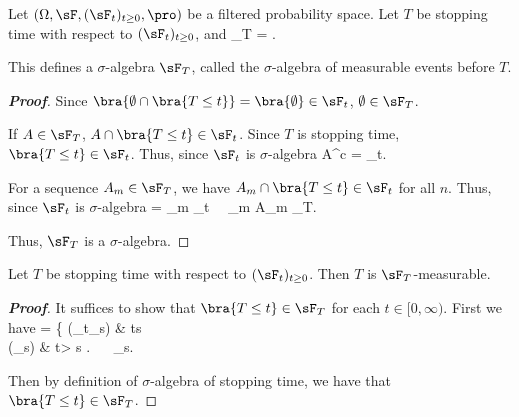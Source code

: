 
\begin{definition}\label{def:sigma_algebra_stopping_time_continuous}
Let $(\Omega,\sF, (\sF_t)_{t\geq 0},\pro)$ be a filtered probability space. Let $T$ be stopping time with respect to $(\sF_t)_{t\geq 0}$, and
\be
\sF_T = \bra{A \in\sF : A\cap \{T \leq t\} \in \sF_t,\ \forall t\in [0,\infty)}.
\ee

This defines a $\sigma$-algebra $\sF_T$, called the $\sigma$-algebra of measurable events before $T$.
\end{definition}

\begin{proof}[\bf Proof]
\ben
\item [(i)] Since $\bra{\emptyset \cap \bra{T\leq t}} = \bra{\emptyset} \in \sF_t$, $\emptyset \in \sF_T$.
\item [(ii)] If $A\in \sF_T$, $A \cap \bra{T\leq t} \in \sF_t$. Since $T$ is stopping time, $\bra{T\leq t}\in \sF_t$. Thus, since $\sF_t$ is $\sigma$-algebra
\be
A^c \cap {} =  \bs {} \in \sF_t.
\ee
\item [(iii)] For a sequence $A_m \in \sF_T$, we have $A_m \cap \bra{T\leq t}\in \sF_t$ for all $n$. Thus, since $\sF_t$ is $\sigma$-algebra
\be
{} \cap {} = \bigcup_m  \in \sF_t  \ \ra \ \bigcup_m A_m \in \sF_T.
\ee
\een

Thus, $\sF_T$ is a $\sigma$-algebra.
\end{proof}

\begin{proposition}
Let $T$ be stopping time with respect to $(\sF_t)_{t\geq 0}$. Then $T$ is $\sF_T$-measurable.
\end{proposition}

\begin{proof}[\bf Proof]
It suffices to show that $\bra{T\leq t}\in \sF_T$ for each $t\in [0,\infty)$. First we have
\be
{}\cap {} = \left\{
 (\in \sF_t\subseteq \sF_s) \quad\quad & t\leq s \\
(\in \sF_s) & t> s
\ea
\right. \ \ra\ \cap {} \in \sF_s.
\ee 

Then by definition of $\sigma$-algebra of stopping time, we have that $\bra{T\leq t}\in \sF_T$.
\end{proof}

